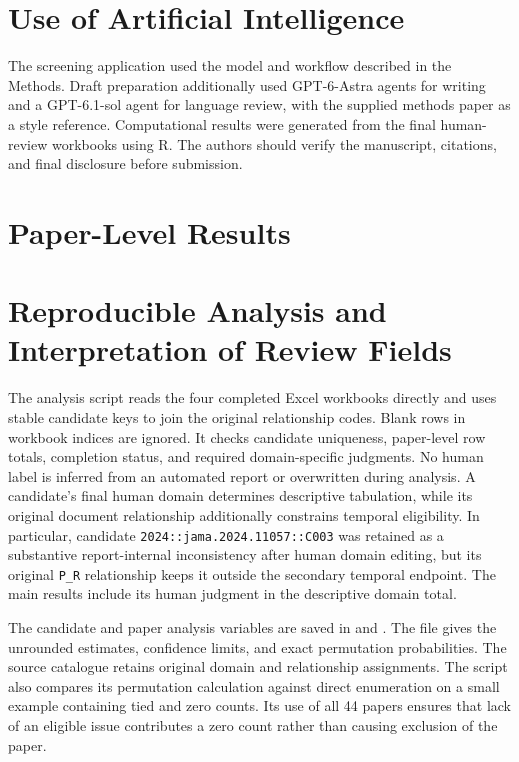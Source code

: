 \documentclass[11pt,a4paper]{article}
\begin{document}
\section*{Use of Artificial Intelligence}
The screening application used the model and workflow described in the Methods. Draft preparation additionally used GPT-6-Astra agents for writing and a GPT-6.1-sol agent for language review, with the supplied methods paper as a style reference. Computational results were generated from the final human-review workbooks using R. The authors should verify the manuscript, citations, and final disclosure before submission.




\clearpage
\appendix
\section{Paper-Level Results}


\section{Reproducible Analysis and Interpretation of Review Fields}
The analysis script reads the four completed Excel workbooks directly and uses stable candidate keys to join the original relationship codes. Blank rows in workbook indices are ignored. It checks candidate uniqueness, paper-level row totals, completion status, and required domain-specific judgments. No human label is inferred from an automated report or overwritten during analysis. A candidate's final human domain determines descriptive tabulation, while its original document relationship additionally constrains temporal eligibility. In particular, candidate \texttt{2024::jama.2024.11057::C003} was retained as a substantive report-internal inconsistency after human domain editing, but its original \texttt{P\_R} relationship keeps it outside the secondary temporal endpoint. The main results include its human judgment in the descriptive domain total.

The candidate and paper analysis variables are saved in  and . The file  gives the unrounded estimates, confidence limits, and exact permutation probabilities. The source catalogue retains original domain and relationship assignments. The script also compares its permutation calculation against direct enumeration on a small example containing tied and zero counts. Its use of all 44 papers ensures that lack of an eligible issue contributes a zero count rather than causing exclusion of the paper.
\end{document}
